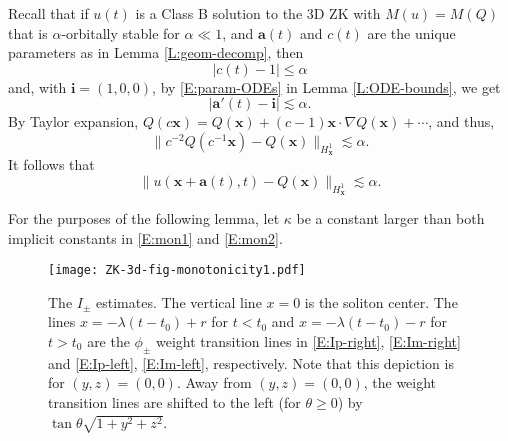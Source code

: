 \documentclass[12pt,letterpaper]{amsart}
\theoremstyle{remark}
\numberwithin{equation}{section}
\numberwithin{theorem}{section}
\numberwithin{table}{section}
\begin{document}
Recall that if  $u(t)$ is a Class B solution to the 3D ZK with $M(u)=M(Q)$  that is $\alpha$-orbitally stable for $\alpha \ll 1$, and  $\mathbf{a}(t)$ and $c(t)$ are the unique parameters as in Lemma \ref{L:geom-decomp}, then 
$$
|c(t)-1| \leq \alpha
$$
and, with $\mathbf{i}=(1,0,0)$, by \eqref{E:param-ODEs} in Lemma \ref{L:ODE-bounds}, we get
\begin{equation}
\label{E:mon1}
|\mathbf{a}'(t) -\mathbf{i} | \lesssim \alpha.
\end{equation}
By Taylor expansion, $Q(c\mathbf{x}) = Q(\mathbf{x}) + (c-1) \mathbf{x} \cdot \nabla Q(\mathbf{x}) + \cdots $,
and thus,
$$
\| c^{-2} Q(c^{-1} \mathbf{x}) - Q(\mathbf{x}) \|_{H_{\mathbf{x}}^1} \lesssim \alpha.
$$
It follows that
\begin{equation}
\label{E:mon2}
\| u(\mathbf{x}+\mathbf{a}(t), t) - Q(\mathbf{x}) \|_{H_{\mathbf{x}}^1} \lesssim \alpha.
\end{equation}

For the purposes of the following lemma, let $\kappa$ be a constant larger than both implicit constants in \eqref{E:mon1} and \eqref{E:mon2}. 

\begin{figure}[ht]
\texttt{[image: ZK-3d-fig-monotonicity1.pdf]}
\caption{The $I_\pm$ estimates.  The vertical line $x=0$ is the soliton center.  The lines $x = -\lambda(t-t_0)+r$ for $t<t_0$ and $x = -\lambda(t-t_0)-r$ for $t>t_0$ are the $\phi_\pm$ weight transition lines in \eqref{E:Ip-right}, \eqref{E:Im-right} and \eqref{E:Ip-left}, \eqref{E:Im-left}, respectively.  Note that this depiction is for $(y,z)=(0,0)$.  Away from $(y,z)=(0,0)$, the weight transition lines are shifted to the left (for $\theta\geq 0$) by $\tan \theta \sqrt{1+y^2+z^2}$.}
\label{F:I}
\end{figure}
\end{document}
